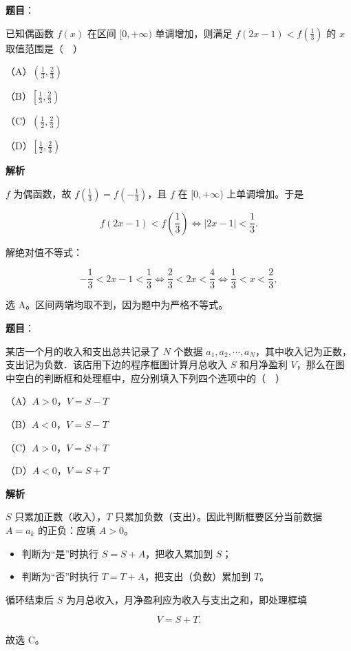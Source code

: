 \begin{answer}

\textbf{题目}：

已知偶函数 $f(x)$ 在区间 $[0,+\infty)$ 单调增加，则满足 $f(2x-1)<f\left(\frac13\right)$ 的 $x$ 取值范围是（　）

（A）$\left(\frac13,\frac23\right)$

（B）$\left[\frac13,\frac23\right)$

（C）$\left(\frac12,\frac23\right)$

（D）$\left[\frac12,\frac23\right)$

\textbf{解析}

$f$ 为偶函数，故 $f\left(\frac13\right)=f\left(-\frac13\right)$，且 $f$ 在 $[0,+\infty)$ 上单调增加。于是

\nopagebreak[4]
\[f(2x-1)<f\left(\frac13\right)
\iff |2x-1|<\frac13 .\]

解绝对值不等式：

\nopagebreak[4]
\[-\frac13<2x-1<\frac13
\iff \frac23<2x<\frac43
\iff \frac13<x<\frac23,\]

选 A。区间两端均取不到，因为题中为严格不等式。


\end{answer}
\begin{answer}

\textbf{题目}：

某店一个月的收入和支出总共记录了 $N$ 个数据 $a_1,a_2,\cdots,a_N$，其中收入记为正数，支出记为负数．该店用下边的程序框图计算月总收入 $S$ 和月净盈利 $V$，那么在图中空白的判断框和处理框中，应分别填入下列四个选项中的（　）

（A）$A>0$，$V=S-T$

（B）$A<0$，$V=S-T$

（C）$A>0$，$V=S+T$

（D）$A<0$，$V=S+T$
\nopagebreak[4]
\begin{center}\end{center}
\nopagebreak[4]
\textbf{解析}

$S$ 只累加正数（收入），$T$ 只累加负数（支出）。因此判断框要区分当前数据 $A=a_k$ 的正负：应填 $A>0$。

\begin{itemize}
\item 判断为“是”时执行 $S=S+A$，把收入累加到 $S$；
\item 判断为“否”时执行 $T=T+A$，把支出（负数）累加到 $T$。
\end{itemize}

循环结束后 $S$ 为月总收入，月净盈利应为收入与支出之和，即处理框填

\nopagebreak[4]
\[V=S+T .\]

故选 C。


\end{answer}
